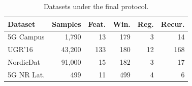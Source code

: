 \begin{table}[t]
\caption{Datasets under the final protocol.}
\label{tab:datasets}
\centering
\footnotesize
\begin{tabular}{@{}lrrrrr@{}}
\toprule
\textbf{Dataset} & \textbf{Samples} & \textbf{Feat.} & \textbf{Win.} & \textbf{Reg.} & \textbf{Recur.} \\
\midrule
5G Campus & 1,790 & 13 & 179 & 3 & 14 \\
UGR'16 & 43,200 & 133 & 180 & 12 & 168 \\
NordicDat & 91,000 & 15 & 182 & 3 & 17 \\
5G NR Lat. & 499 & 11 & 499 & 4 & 6 \\
\bottomrule
\end{tabular}
\end{table}
